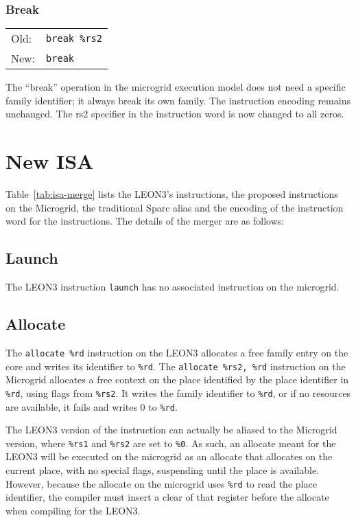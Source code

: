 \documentclass[a4paper,11pt]{article}
\newcommand{\leon}{{LEON3}\xspace}
\begin{document}
\subsubsection{Break}
\begin{tabular}{ll}
Old:&{\tt break \%rs2} \\
New:&{\tt break} \\
\end{tabular}

The ``break'' operation in the microgrid execution model does not need a specific family identifier; it always break its own family.
The instruction encoding remains unchanged. The rs2 specifier in the instruction word is now changed to all zeros.

\section{New ISA}

Table~\ref{tab:isa-merge} lists the \leon's instructions, the proposed instructions on the Microgrid, the traditional Sparc alias and the encoding of the instruction word for the instructions. The details of the merger are as follows:

\subsection{Launch}
The \leon instruction {\tt launch} has no associated instruction on the microgrid.

\subsection{Allocate}
The {\tt allocate \%rd} instruction on the \leon allocates a free family entry on the core and writes its identifier to {\tt \%rd}.
The {\tt allocate \%rs2, \%rd} instruction on the Microgrid allocates a free context on the place identified by the place identifier in {\tt \%rd}, using flags from {\tt \%rs2}. It writes the family identifier to {\tt \%rd}, or if no resources are available, it fails and writes 0 to {\tt \%rd}.

The \leon version of the instruction can actually be aliased to the Microgrid version, where {\tt \%rs1} and {\tt \%rs2} are set to {\tt \%0}. As such, an allocate meant for the \leon will be executed on the microgrid as an allocate that allocates on the current place, with no special flags, suspending until the place is available. However, because the allocate on the microgrid uses {\tt \%rd} to read the place identifier, the compiler must insert a clear of that register before the allocate when compiling for the \leon.
\end{document}
